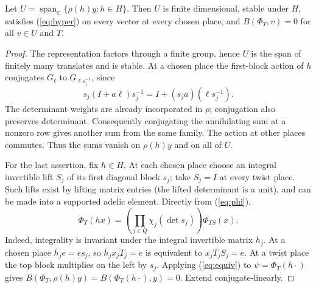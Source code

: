\documentclass[11pt,letterpaper]{article}
\newcommand{\C}{\mathbb C}\newcommand{\Ocal}{\mathcal O}\newcommand{\p}{\mathfrak p}\newcommand{\G}{\mathrm{GL}}\newcommand{\SB}{\mathcal S}\newcommand{\supp}{\operatorname{supp}}\newcommand{\Tr}{\operatorname{Tr}}\newcommand{\id}{\mathrm{id}}\newcommand{\av}{\operatorname{Av}}\newcommand{\B}{\mathcal B}
\begin{document}
\begin{lemma}\label{lem:span}
Let $U=\operatorname{span}_{\C}\{\rho(h)y:h\in H\}$. Then $U$ is finite dimensional, stable under $H$, satisfies (\ref{eq:hyper}) on every vector at every chosen place, and $B(\Phi_T,v)=0$ for all $v\in U$ and $T$.
\end{lemma}
\begin{proof}
The representation factors through a finite group, hence $U$ is the span of finitely many translates and is stable. At a chosen place the first-block action of $h$ conjugates $G_\ell$ to $G_{\ell s_j^{-1}}$, since
\[
 s_j (I+a\ell)s_j^{-1}=I+(s_j a)(\ell s_j^{-1}).
\]
The determinant weights are already incorporated in $\rho$; conjugation also preserves determinant. Consequently conjugating the annihilating sum at a nonzero row gives another sum from the same family. The action at other places commutes. Thus the sums vanish on $\rho(h)y$ and on all of $U$.

For the last assertion, fix $h\in H$. At each chosen place choose an integral invertible lift $S_j$ of its first diagonal block $s_j$; take $S_j=I$ at every twist place. Such lifts exist by lifting matrix entries (the lifted determinant is a unit), and can be made into a supported adelic element. Directly from (\ref{eq:phi}),
\begin{equation}\label{eq:right}
 \Phi_T(hx)=\left(\prod_{j\in Q}\chi_j(\det s_j)\right)\Phi_{TS}(x).
\end{equation}
Indeed, integrality is invariant under the integral invertible matrix $h_j$. At a chosen place $\bar h_j e=e s_j$, so $\bar h_j\overline{x_jT_j}=e$ is equivalent to $\overline{x_jT_jS_j}=e$. At a twist place the top block multiplies on the left by $s_j$. Applying (\ref{eq:equiv}) to $\psi=\Phi_T(h\cdot)$ gives $B(\Phi_T,\rho(h)y)=B(\Phi_T(h\cdot),y)=0$. Extend conjugate-linearly.
\end{proof}
\end{document}
